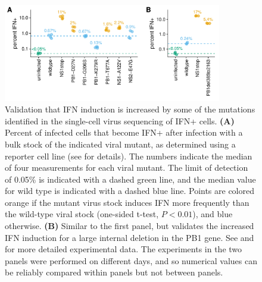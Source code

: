 \documentclass[9pt,lineno]{template}
\begin{document}
\begin{figure}

\centerline{\includegraphics[width=0.85\textwidth]{figures/Validation_Figure/ifn_plot.pdf}}
\caption{Validation that IFN induction is increased by some of the mutations identified in the single-cell virus sequencing of IFN+ cells.
{\bf (A)}
Percent of infected cells that become IFN+ after infection with a bulk stock of the indicated viral mutant, as determined using a reporter cell line (see  for details).
The numbers indicate the median of four measurements for each viral mutant.
The limit of detection of 0.05\% is indicated with a dashed green line, and the median value for wild type is indicated with a dashed blue line.
Points are colored orange if the mutant virus stock induces IFN more frequently than the wild-type viral stock (one-sided t-test, $P < 0.01$), and blue otherwise.
{\bf (B)}
Similar to the first panel, but validates the increased IFN induction for a large internal deletion in the PB1 gene.
See  and  for more detailed experimental data.
The experiments in the two panels were performed on different days, and so numerical values can be reliably compared within panels but not between panels.
}
\label{fig:validation}


\end{figure}
\end{document}
